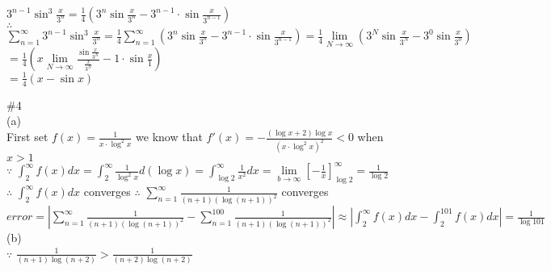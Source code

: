 \documentclass{article}
\begin{document}
$\displaystyle 3^{n-1} \sin^3{\frac{x}{3^n}} = \frac{1}{4} \left(3^n \sin{\frac{x}{3^n}} - 3^{n-1} \cdot \sin{\frac{x}{3^{n-1}}}\right)$\\

$\therefore$ \qquad $\displaystyle \sum \limits_{n=1}^\infty 3^{n-1} \sin^3{\frac{x}{3^n}} = \frac{1}{4} \sum \limits_{n=1}^\infty \left(3^n \sin{\frac{x}{3^n}} - 3^{n-1} \cdot \sin{\frac{x}{3^{n-1}}}\right) = \frac{1}{4} \lim \limits_{N \to \infty} \left(3^N \sin{\frac{x}{3^N}} - 3^0 \sin{\frac{x}{3^0}}\right)$\\

\hskip 9.5cm $\displaystyle = \frac{1}{4} \left(x \lim \limits_{N \to \infty} \frac{\sin{\frac{x}{3^N}}}{\frac{x}{3^N}} - 1 \cdot \sin{\frac{x}{1}}\right)$\\

\hskip 9.5cm $\displaystyle = \frac{1}{4} (x - \sin{x})$\\

\vskip 3cm

\textcolor[rgb]{0.00,0.00,0.50}{\#4}\\

(a)\\

First set $f(x) = \frac{1}{x \cdot \log^2{x}}$ \quad we know that $f'(x) = - \frac{(\log{x} + 2) \log{x}}{(x \cdot \log^2{x})^2} < 0$ when $x>1$\\

$\because$ \qquad $\displaystyle \int_2^\infty f(x)dx = \int_2^\infty \frac{1}{\log^2{x}}d(\log{x}) = \int_{\log{2}}^\infty \frac{1}{x^2}dx = \lim \limits_{b \to \infty} \left[-\frac{1}{x}\right]_{\log{2}}^\infty = \frac{1}{\log{2}}$\\

$\therefore$ \qquad $\displaystyle \int_2^\infty f(x)dx$ converges \qquad $\therefore$ \qquad $\displaystyle \sum \limits_{n=1}^\infty \frac{1}{(n+1)(\log{(n+1)})^2}$ converges\\

$\displaystyle error = \left|\sum \limits_{n=1}^\infty \frac{1}{(n+1) (\log{(n+1)})^2} - \sum \limits_{n=1}^{100} \frac{1}{(n+1)(\log{(n+1)})^2}\right| \approx \left|\int_2^\infty f(x)dx - \int_2^{101}f(x)dx\right| = \frac{1}{\log{101}}$\\

(b)\\

$\because$ \qquad $\displaystyle \frac{1}{(n+1)\log{(n+2)}} > \frac{1}{(n+2) \log{(n+2)}}$\\
\end{document}
